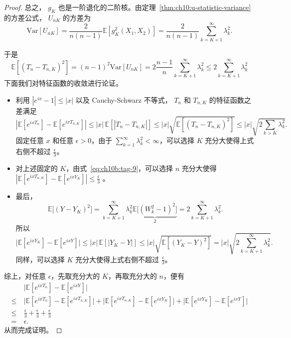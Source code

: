 \begin{proof}
总之， $g_K$ 也是一阶退化的二阶核。由定理~\ref{thm:ch10:u-statistic-variance} 的方差公式， $U_{nK}$ 的方差为
\[
\mathrm{Var}[U_{nK}]
=\frac{2}{n(n-1)}\mathbb{E}[g_K^2(X_1,X_2)]
=\frac{2}{n(n-1)}\sum_{k=K+1}^\infty\lambda_k^2.
\]

于是
\[\mathbb {E}[(T_n-T_{n,K})^2]=(n-1)^2\mathrm{Var}[U_{nK}]=2\frac{n-1}{n}\sum_{k=K+1}^\infty\lambda_k^2\le 2\sum_{k=K+1}^\infty\lambda_k^2\]
下面我们对特征函数的收敛进行论证。

\begin{itemize}
\tightlist
\item
  利用 $|e^{i x} - 1| \le |x|$ 以及 Cauchy-Schwarz 不等式， $T_n$ 和 $T_{n,K}$ 的特征函数之差满足
  \[  |\mathbb{E}[e^{ixT_n}]-\mathbb{E}[e^{ixT_{n,K}}]| \le |x| \,\mathbb{E}[|T_n - T_{n,K}|] \le |x| \sqrt{\mathbb{E}[(T_n - T_{n,K})^2]} \le |x| \sqrt{2\sum_{k>K} \lambda_k^2}.
  \]  固定任意 $x$ 和任意 $\epsilon > 0$，由于 $\textstyle\sum_{k=1}^{\infty} \lambda_k^2 < \infty$，可以选择 $K$ 充分大使得上式右侧不超过 $\tfrac \epsilon 3$。
\item
  对上述固定的 $K$，由式~\eqref{eq:ch10b:tag-9}，可以选择 $n$ 充分大使得 $|\mathbb{E}[e^{i x T_{n,K}}]-\mathbb{E}[e^{i x Y_{K}}]| \le \tfrac\epsilon3$ 。
\item
  最后，
  \[  \mathbb{E}\bigl[ (Y - Y_K)^2 \bigr] = \sum_{k=K+1}^{\infty} \lambda_k^2 \underbrace{\mathbb{E}\bigl[ (W_k^2 - 1)^2 \bigr] }_{2} =2 \sum_{k=K+1}^{\infty} \lambda_k^2.
  \]  所以
  \[  \bigl| \mathbb{E}[e^{i x Y_K}] - \mathbb{E}[e^{i x Y}] \bigr| \le |x| \, \mathbb{E}[|Y_K - Y|] \le |x| \sqrt{ \mathbb{E}[(Y_K - Y)^2] } = |x| \sqrt{ 2\sum_{k=K+1}^{\infty} \lambda_k^2 }.
  \]  同样，可以选择 $K$ 充分大使得上式右侧不超过 $\tfrac \epsilon 3$。
\end{itemize}

综上，对任意 $\epsilon$，先取充分大的 $K$，再取充分大的 $n$，便有\[\begin{aligned} &\bigl| \mathbb{E}[e^{i x T_n}] - \mathbb{E}[e^{i x Y}] \bigr| \\ \le\ & \bigl| \mathbb{E}[e^{i x T_n}] - \mathbb{E}[e^{i x T_{n,K}}] \bigr| + \bigl| \mathbb{E}[e^{i x T_{n,K}}] - \mathbb{E}[e^{i x Y_K}] \bigr| + \bigl| \mathbb{E}[e^{i x Y_K}] - \mathbb{E}[e^{i x Y}] \bigr| \\ \le\ & \frac{\epsilon}{3} + \frac{\epsilon}{3} + \frac{\epsilon}{3} \\ =\ & \epsilon. \end{aligned}\]从而完成证明。

\end{proof}

